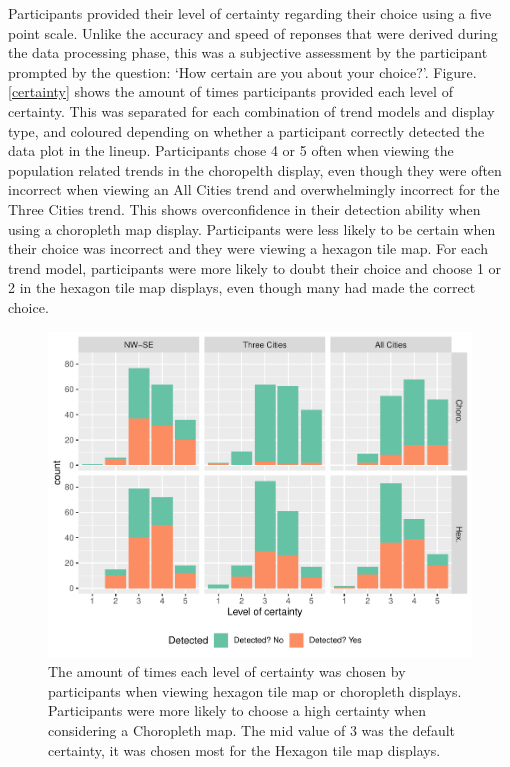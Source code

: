 \documentclass[conference,final,]{IEEEtran}
\makeatletter
\def\maxwidth{\ifdim\Gin@nat@width>\linewidth\linewidth
\else\Gin@nat@width\fi}
\let\Oldincludegraphics\includegraphics
\renewcommand{\includegraphics}[1]{\Oldincludegraphics[width=\maxwidth]{#1}}
\makeatother
\begin{document}
Participants provided their level of certainty regarding their choice using a five point scale.
Unlike the accuracy and speed of reponses that were derived during the data processing phase, this was a subjective
assessment by the participant prompted by the question: `How certain are you about your choice?'.
Figure. \ref{certainty} shows the amount of times participants provided each level of certainty. This was separated for each combination of trend models and display type, and coloured depending on whether a participant correctly detected the data plot in the lineup.
Participants chose 4 or 5 often when viewing the population related trends in the choropelth display, even though they were often incorrect when viewing an All Cities trend and overwhelmingly incorrect for the Three Cities trend. This shows overconfidence in their detection ability when using a choropleth map display. Participants were less likely to be certain when their choice was incorrect and they were viewing a hexagon tile map.
For each trend model, participants were more likely to doubt their choice and choose 1 or 2 in the hexagon tile map displays, even though many had made the correct choice.

\begin{figure}
\centering
\includegraphics{paper_files/figure-latex/certainty-1.pdf}
\caption{\label{fig:certainty}The amount of times each level of certainty was chosen by participants when viewing hexagon tile map or choropleth displays. Participants were more likely to choose a high certainty when considering a Choropleth map. The mid value of 3 was the default certainty, it was chosen most for the Hexagon tile map displays.}
\end{figure}
\end{document}
